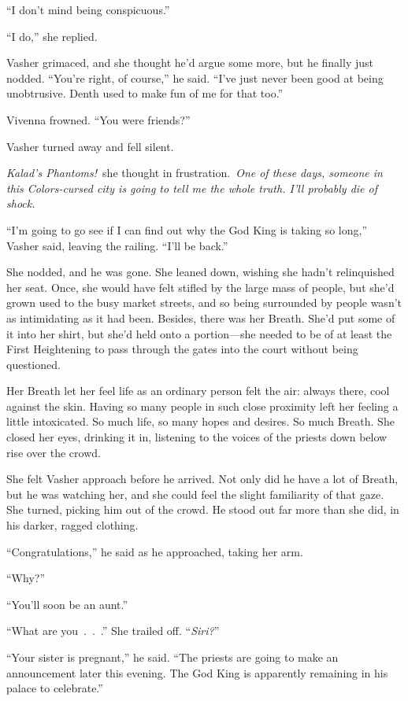 “I don’t mind being conspicuous.”

“I do,” she replied.

Vasher grimaced, and she thought he’d argue some more, but he finally just nodded. “You’re right, of course,” he said. “I’ve just never been good at being unobtrusive. Denth used to make fun of me for that too.”

Vivenna frowned. “You were friends?”

Vasher turned away and fell silent.

\textit{Kalad’s Phantoms!}~she thought in frustration.~\textit{One of these days, someone in this Colors-cursed city is going to tell me the whole truth. I’ll probably die of shock.}

“I’m going to go see if I can find out why the God King is taking so long,” Vasher said, leaving the railing. “I’ll be back.”

She nodded, and he was gone. She leaned down, wishing she hadn’t relinquished her seat. Once, she would have felt stifled by the large mass of people, but she’d grown used to the busy market streets, and so being surrounded by people wasn’t as intimidating as it had been. Besides, there was her Breath. She’d put some of it into her shirt, but she’d held onto a portion—she needed to be of at least the First Heightening to pass through the gates into the court without being questioned.

Her Breath let her feel life as an ordinary person felt the air: always there, cool against the skin. Having so many people in such close proximity left her feeling a little intoxicated. So much life, so many hopes and desires. So much Breath. She closed her eyes, drinking it in, listening to the voices of the priests down below rise over the crowd.

She felt Vasher approach before he arrived. Not only did he have a lot of Breath, but he was watching her, and she could feel the slight familiarity of that gaze. She turned, picking him out of the crowd. He stood out far more than she did, in his darker, ragged clothing.

“Congratulations,” he said as he approached, taking her arm.

“Why?”

“You’ll soon be an aunt.”

“What are you~.~.~.” She trailed off. “\textit{Siri?}”

“Your sister is pregnant,” he said. “The priests are going to make an announcement later this evening. The God King is apparently remaining in his palace to celebrate.”

